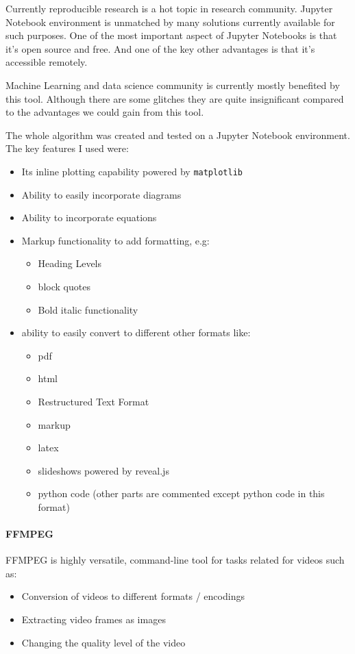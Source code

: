 Currently reproducible research is a hot topic in research community. Jupyter Notebook environment is unmatched by many solutions currently available for such purposes. One of the most important aspect of Jupyter Notebooks is that it's open source and free. And one of the key other advantages is that it's accessible remotely. 

Machine Learning and data science community is currently mostly benefited by this tool. Although there are some glitches they are quite insignificant compared to the advantages we could gain from this tool.

The whole algorithm was created and tested on a Jupyter Notebook environment. The key features I used were: 
\begin{itemize}
\item Its inline plotting capability powered by \texttt{matplotlib}
\item Ability to easily incorporate diagrams
\item Ability to incorporate equations
\item Markup functionality to add formatting, e.g:
	\begin{itemize}
	\item Heading Levels
	\item block quotes
	\item Bold italic functionality
	\end{itemize}
\item ability to easily convert to different other formats like:
	\begin{itemize}
	\item pdf
	\item html
	\item Restructured Text Format
	\item markup
	\item latex
	\item slideshows powered by reveal.js
	\item python code (other parts are commented except python code in this format)
	\end{itemize}
\end{itemize}


\paragraph{FFMPEG}

FFMPEG is highly versatile, command-line tool for tasks related for videos such as:

\begin{itemize}
\item Conversion of videos to different formats / encodings
\item Extracting video frames as images
\item Changing the quality level of the video
\end{itemize}


